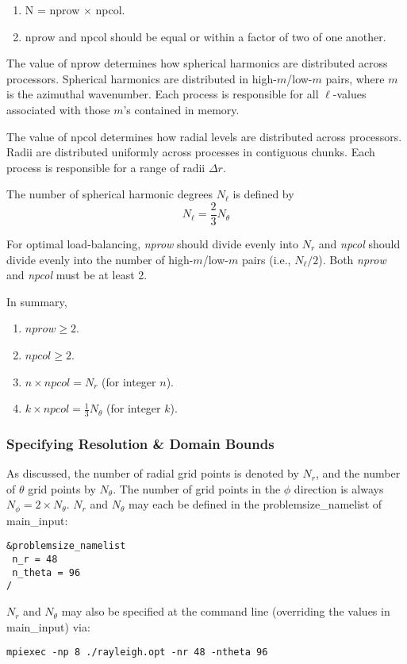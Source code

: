 \begin{enumerate}
\item N = nprow $\times$ npcol.                                           
\item nprow and npcol should be equal or within a factor of two of one another.                   
\end{enumerate}

The value of nprow determines how spherical harmonics are distributed across processors.   Spherical harmonics are distributed in high-$m$/low-$m$ pairs, where $m$ is the azimuthal wavenumber.  Each process is responsible for all $\ell$-values associated with those $m$'s contained in memory.

The value of npcol determines how radial levels are distributed across processors.  Radii are distributed uniformly across processes in contiguous chunks.  Each process is responsible for a range of radii $\Delta r$.

The number of spherical harmonic degrees $N_\ell$ is defined by
\begin{equation}
N_\ell = \frac{2}{3}N_\theta
\end{equation}

For optimal load-balancing, \textit{nprow} should divide evenly into $N_r$ and \textit{npcol} should divide evenly into the number of high-$m$/low-$m$ pairs (i.e., $N_\ell/2$).  Both \textit{nprow} and \textit{npcol} must be at least 2.

In summary,
\begin{enumerate}
\item $nprow \ge 2$.
\item $npcol \ge 2$.
\item $n \times npcol = N_r$ (for integer $n$).
\item $k \times npcol = \frac{1}{3}N_\theta$ (for integer $k$).
\end{enumerate}

\subsubsection{Specifying Resolution \& Domain Bounds}
As discussed, the number of radial grid points is denoted by $N_r$, and the number of $\theta$ grid points by $N_\theta$.  The number of grid points in the $\phi$ direction is always $N_\phi=2\times N_\theta$.  $N_r$ and $N_\theta$ may each be defined in the problemsize\_namelist of main\_input:
\begin{lstlisting}
&problemsize_namelist
 n_r = 48
 n_theta = 96
/
\end{lstlisting}
$N_r$ and $N_\theta$ may also be specified at the command line (overriding the values in main\_input) via:
\begin{lstlisting}
mpiexec -np 8 ./rayleigh.opt -nr 48 -ntheta 96
\end{lstlisting}

